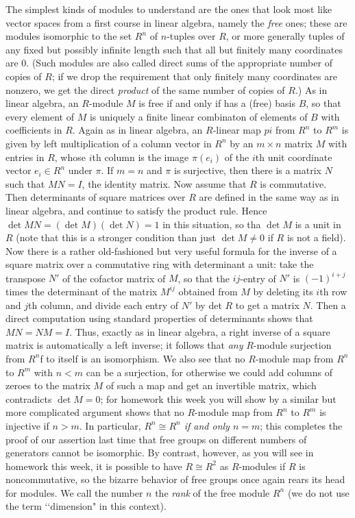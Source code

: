 \documentclass[10pt]{article}
\begin{document}
The simplest kinds of modules to understand are the ones that look most
like vector spaces from a first course in linear algebra, namely the
{\sl free} ones; these are modules isomorphic to the set $R^n$ of
$n$-tuples over $R$, or more generally tuples of any fixed but possibly
infinite length such that all but finitely many coordinates are 0. (Such
modules are also called direct sums of the appropriate number of copies
of $R$; if we drop the requirement that only finitely many coordinates
are nonzero, we get the direct {\sl product} of the same number of
copies of $R$.) As in linear algebra, an $R$-module $M$ is free if and
only if has a (free) basis $B$, so that every element of $M$ is uniquely
a finite linear combinaton of elements of $B$ with coefficients in $R$.
Again as in linear algebra, an $R$-linear map $pi$ from $R^n$ to $R^m$
is given by left multiplication of a column vector in $R^n$ by an
$m\times n$ matrix $M$ with entries in $R$, whose $i$th column is the
image $\pi(e_i)$ of the $i$th unit coordinate vector $e_i\in R^n$ under
$\pi$. If $m=n$ and $\pi$ is surjective, then there is a matrix $N$ such
that $MN = I$, the identity matrix. Now assume that $R$ is commutative.
Then determinants of square matrices over $R$ are defined in the same
way as in linear algebra, and continue to satisfy the product rule.
Hence $\det MN =(\det M)(\det N) = 1$ in this situation, so tha $\det M$
is a unit in $R$ (note that this is a stronger condition than just $\det
M\ne0$ if $R$ is not a field). Now there is a rather old-fashioned but
very useful formula for the inverse of a square matrix over a
commutative ring with determinant a unit: take the transpose $N'$ of the
cofactor matrix of $M$, so that the $ij$-entry of $N'$ is $(-1)^{i+j}$
times the determinant of the matrix $M^{ij}$ obtained from $M$ by
deleting its $i$th row and $j$th column, and divide each entry of $N'$
by det $R$ to get a matrix $N$. Then a direct computation using standard
properties of determinants shows that $MN = NM = I$. Thus, exactly as in
linear algebra, a right inverse of a square matrix is automatically a
left inverse; it follows that {\sl any} $R$-module surjection from $R^n$f
  to itself is an isomorphism. We also see that no $R$-module map from
  $R^n$ to $R^m$ with $n<m$ can be a surjection, for otherwise we could
  add columns of zeroes to the matrix $M$ of such a map and get an
  invertible matrix, which contradicts $\det M=0$; for homework this
  week you will show by a similar but more complicated argument shows
  that no $R$-module map from $R^n$ to $R^m$ is injective if $n>m$. In
  particular, {\sl $R^n \cong R^n$ if and only $n=m$}; this completes
  the proof of our assertion last time that free groups on different
  numbers of generators cannot be isomorphic. By contrast, however, as
  you will see in homework this week, it is possible to have $R\cong
  R^2$ as $R$-modules if $R$ is noncommutative, so the bizarre behavior
  of free groups once again rears its head for modules. We call the
  number $n$ the {\sl rank} of the free module $R^n$ (we do not use the
  term \lq\lq dimension" in this context).
\end{document}
